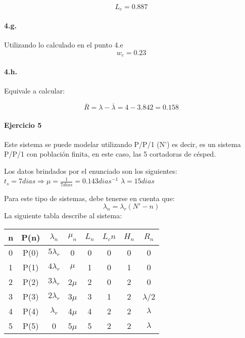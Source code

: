 \documentclass{article}
\begin{document}
    $$ L_c = 0.887$$
    
    \paragraph{4.g.} Utilizando lo calculado en el punto 4.e
    $$ w_c = 0.23 $$
    \paragraph{4.h.} Equivale a calcular:

    $$\overline{R} = \lambda - \overline{\lambda} = 4 - 3.842 = 0.158$$

\paragraph{Ejercicio 5}
  Este sistema se puede modelar utilizando P/P/1 (N') es decir, es un sistema P/P/1 con poblaci\'on finita, en este caso, las 5 cortadoras de c\'esped.
  
  Los datos brindados por el enunciado son los siguientes: $t_s = 7 dias\Rightarrow \mu = \frac{1}{7dias} = 0.143dias^{-1} $  $\lambda = 15 dias$
  
  Para este tipo de sistemas, debe tenerse en cuenta que:
  $$\lambda_n = \lambda_r (N' - n)$$
    La siguiente tabla describe al sistema:
    \begin{center}
    \begin{tabular}{|| c | c | c | c | c | c | c | c ||}
    \hline 
     n & P(n) & $\lambda_n$ & $\mu_n$ & $L_n$& $L_cn$ & $H_n$ & $R_n$ \\ \hline \hline
     0 & P(0) & $5\lambda_r$   & 0       & 0    & 0      & 0     & 0	\\ \hline
     1 & P(1) & $4\lambda_r$   & $\mu$   & 1    & 0      & 1     & 0	\\ \hline
     2 & P(2) & $3\lambda_r$   & 2$\mu$  & 2    & 0      & 2     & 0	\\ \hline
     3 & P(3) & $2\lambda_r$ & 3$\mu$  & 3    & 1      & 2     & $\lambda$/2 \\ \hline
     4 & P(4) & $\lambda_r$       & 4$\mu$  & 4    & 2      & 2     & $\lambda$   \\ \hline  
     5 & P(5) & 0           & 5$\mu$  & 5    & 2      & 2     & $\lambda$   \\ \hline
    \end{tabular}
    \end{center}
  
    
    
\end{document}
